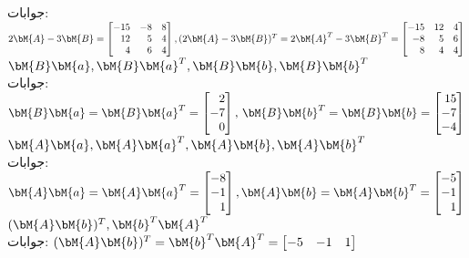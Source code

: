 جوابات:
$2\bM{A}-3\bM{B}=\begin{bmatrix*}[r] -15&-8&8\\12&5&4\\4&6&4 \end{bmatrix*},(2\bM{A}-3\bM{B})^T=2\bM{A}^T-3\bM{B}^T=\begin{bmatrix*}[r] -15&12&4\\-8&5&6\\8&4&4 \end{bmatrix*}$
\quad
$\bM{B}\bM{a}, \bM{B}\bM{a}^T, \bM{B}\bM{b},\bM{B}\bM{b}^T $\\
جوابات:
$\bM{B}\bM{a}=\bM{B}\bM{a}^T=\begin{bmatrix*}[r]2\\-7\\0 \end{bmatrix*}, \,\bM{B}\bM{b}^T=\bM{B}\bM{b}=\begin{bmatrix*}[r] 15\\-7\\-4 \end{bmatrix*}$
\quad
$\bM{A}\bM{a},\bM{A}\bM{a}^T, \bM{A}\bM{b},\bM{A}\bM{b}^T$\\
جوابات:
$\bM{A}\bM{a}=\bM{A}\bM{a}^T=\begin{bmatrix*}[r]-8\\-1\\1 \end{bmatrix*}, \bM{A}\bM{b}=\bM{A}\bM{b}^T=\begin{bmatrix*}[r]-5\\-1\\1 \end{bmatrix*}$
\quad
$(\bM{A}\bM{b})^T, \bM{b}^T\bM{A}^T$\\
جوابات:
$(\bM{A}\bM{b})^T=\bM{b}^T\bM{A}^T=\begin{bmatrix*}[r] -5&-1&1 \end{bmatrix*}$

